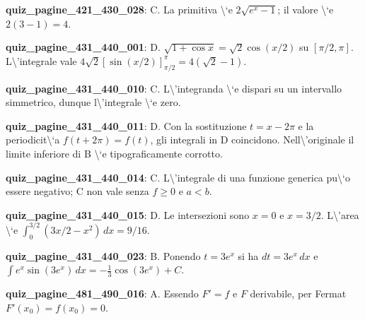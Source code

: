 \documentclass[11pt,a4paper]{article}
\newcounter{quiz}
\begin{document}
\noindent\textbf{quiz\_pagine\_421\_430\_028}: C. La primitiva \textbackslash{}`e $2\sqrt{e^x-1}$; il valore \textbackslash{}`e $2(3-1)=4$.\par\medskip
\noindent\textbf{quiz\_pagine\_431\_440\_001}: D. $\sqrt{1+\cos x}=\sqrt2\cos(x/2)$ su $[\pi/2,\pi]$. L\textbackslash{}'integrale vale $4\sqrt2[\sin(x/2)]_{\pi/2}^{\pi}=4(\sqrt2-1)$.\par\medskip
\noindent\textbf{quiz\_pagine\_431\_440\_010}: C. L\textbackslash{}'integranda \textbackslash{}`e dispari su un intervallo simmetrico, dunque l\textbackslash{}'integrale \textbackslash{}`e zero.\par\medskip
\noindent\textbf{quiz\_pagine\_431\_440\_011}: D. Con la sostituzione $t=x-2\pi$ e la periodicit\textbackslash{}`a $f(t+2\pi)=f(t)$, gli integrali in D coincidono. Nell\textbackslash{}'originale il limite inferiore di B \textbackslash{}`e tipograficamente corrotto.\par\medskip
\noindent\textbf{quiz\_pagine\_431\_440\_014}: C. L\textbackslash{}'integrale di una funzione generica pu\textbackslash{}`o essere negativo; C non vale senza $f\geq0$ e $a<b$.\par\medskip
\noindent\textbf{quiz\_pagine\_431\_440\_015}: D. Le intersezioni sono $x=0$ e $x=3/2$. L\textbackslash{}'area \textbackslash{}`e $\int_0^{3/2}(3x/2-x^2)\,dx=9/16$.\par\medskip
\noindent\textbf{quiz\_pagine\_431\_440\_023}: B. Ponendo $t=3e^x$ si ha $dt=3e^x\,dx$ e $\int e^x\sin(3e^x)\,dx=-\frac13\cos(3e^x)+C$.\par\medskip
\noindent\textbf{quiz\_pagine\_481\_490\_016}: A. Essendo $F\prime=f$ e $F$ derivabile, per Fermat $F\prime(x_0)=f(x_0)=0$.\par\medskip
\end{document}
